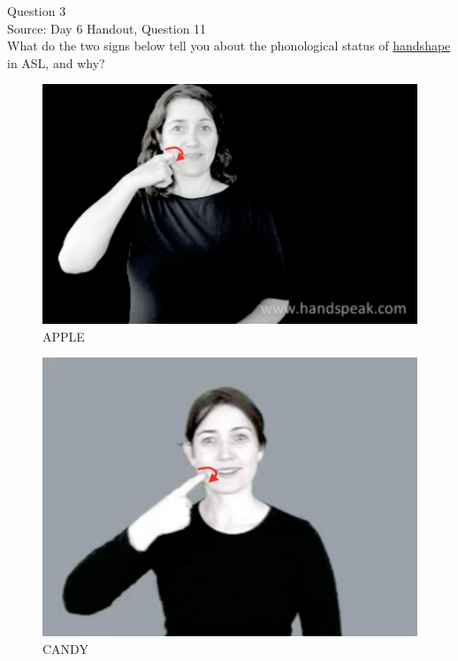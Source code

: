 \documentclass[12pt]{article}
\begin{document}
\newpage

{\large Question 3}\\

Source: Day 6 Handout, Question 11\\

What do the two signs below tell you about the phonological status of \underline{handshape} in ASL, and why?\\

\begin{figure}[H]
\includegraphics{../images/asl_apple.png}
\caption{APPLE}
\end{figure}
\begin{figure}[H]
\includegraphics{../images/asl_candy.png}
\caption{CANDY}
\end{figure}

\newpage
\end{document}
